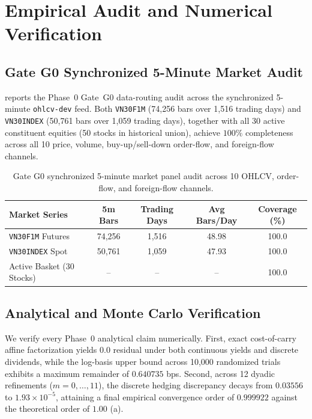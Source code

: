 \section{Empirical Audit and Numerical Verification}
\label{sec:experiments}

\subsection{Gate G0 Synchronized 5-Minute Market Audit}
\label{sec:exp_audit}

 reports the Phase~0 Gate~G0 data-routing audit across the synchronized 5-minute \texttt{ohlcv-dev} feed. Both \texttt{VN30F1M} (74,256 bars over 1,516 trading days) and \texttt{VN30INDEX} (50,761 bars over 1,059 trading days), together with all 30 active constituent equities (50 stocks in historical union), achieve $100\%$ completeness across all 10 price, volume, buy-up/sell-down order-flow, and foreign-flow channels.

\begin{table}[t]
  \centering
  \caption{Gate G0 synchronized 5-minute market panel audit across 10 OHLCV, order-flow, and foreign-flow channels.}
  \label{tab:g0_audit}
  \begin{tabular}{lcccc}
    \toprule
    Market Series & 5m Bars & Trading Days & Avg Bars/Day & Coverage (\%) \\
    \midrule
    \texttt{VN30F1M} Futures & 74,256 & 1,516 & 48.98 & 100.0 \\
    \texttt{VN30INDEX} Spot & 50,761 & 1,059 & 47.93 & 100.0 \\
    Active Basket (30 Stocks) & -- & -- & -- & 100.0 \\
    \bottomrule
  \end{tabular}
\end{table}

\subsection{Analytical and Monte Carlo Verification}
\label{sec:exp_math}

We verify every Phase~0 analytical claim numerically. First, exact cost-of-carry affine factorization yields $0.0$ residual under both continuous yields and discrete dividends, while the log-basis upper bound across 10,000 randomized trials exhibits a maximum remainder of $0.640735$ bps. Second, across 12 dyadic refinements ($m = 0, \dots, 11$), the discrete hedging discrepancy decays from $0.03556$ to $1.93 \times 10^{-5}$, attaining a final empirical convergence order of $0.999922$ against the theoretical order of $1.00$ (a).


